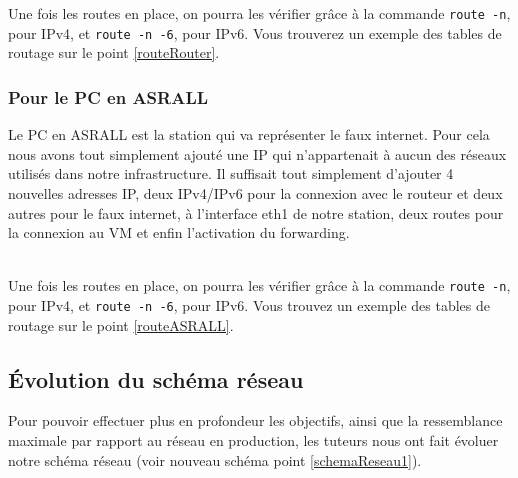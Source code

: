 			Une fois les routes en place, on pourra les vérifier grâce à la commande \verb?route -n?, pour IPv4, et \verb?route -n -6?, pour IPv6. Vous trouverez un exemple des tables de routage  sur le point \ref{routeRouter}.\\


		\subsubsection{Pour le PC en ASRALL}
			\vspace{0.3cm}
			Le PC en ASRALL est la station qui va représenter le faux internet. Pour cela nous avons tout simplement ajouté une IP qui n'appartenait à aucun des réseaux utilisés dans notre infrastructure. Il suffisait tout simplement d'ajouter 4 nouvelles adresses IP, deux IPv4/IPv6 pour la connexion avec le routeur et deux autres pour le faux internet, à l'interface eth1 de notre station, deux routes pour la connexion au VM et enfin l'activation du forwarding.

			\\

			Une fois les routes en place, on pourra les vérifier grâce à la commande \verb?route -n?, pour IPv4, et \verb?route -n -6?, pour IPv6. Vous trouvez un exemple des tables de routage sur le point \ref{routeASRALL}.\\
	
	\subsection{Évolution du schéma réseau}
		\vspace{0.3cm}
		Pour pouvoir effectuer plus en profondeur les objectifs, ainsi que la ressemblance maximale par rapport au réseau en production, les tuteurs nous ont fait évoluer notre schéma réseau (voir nouveau schéma point \ref{schemaReseau1}).\\

